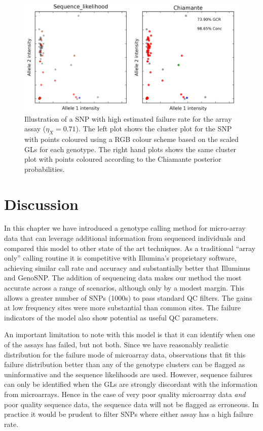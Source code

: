\begin{figure}[p]
  \begin{center} 
    \includegraphics[width=\textwidth]{chap2figs/arrayfail_snp}
    \caption[Illustration of a SNP with high estimated array failure]{Illustration of a SNP with high estimated failure rate for the array assay ($\eta_X=0.71$). The left plot shows the cluster plot for the SNP with points coloured using a RGB colour scheme based on the scaled GLs for each genotype. The right hand plots shows the same cluster plot with points coloured according to the Chiamante posterior probabilities.   \label{array_fail_1}}
  \end{center} 
\end{figure}

\section{Discussion}

In this chapter we have introduced a genotype calling method for micro-array data that can leverage additional information from sequenced individuals and compared this model to other state of the art techniques.  As a traditional ``array only'' calling routine it is competitive with Illumina's proprietary software, achieving similar call rate and accuracy and substantially better that Illuminus and GenoSNP.  The addition of sequencing data makes our method the most accurate across a range of scenarios, although only by a modest margin.  This allows a greater number of SNPs (1000s) to pass standard QC filters.  The gains at low frequency sites were more substantial than common sites.  The failure indicators of the model also show potential as useful QC parameters.

An important limitation to note with this model is that it can identify when one of the assays has failed, but not both. Since we have reasonably realistic distribution for the failure mode of microarray data, observations that fit this failure distribution better than any of the genotype clusters can be flagged as uninformative and the sequence likelihoods are used.  However, sequence failures can only be identified when the GLs are strongly discordant with the information from microarrays. Hence in the case of very poor quality microarray data \emph{and} poor quality sequence data, the sequence data will not be flagged as erroneous.  In practice it would be prudent to filter SNPs where either assay has a high failure rate.

